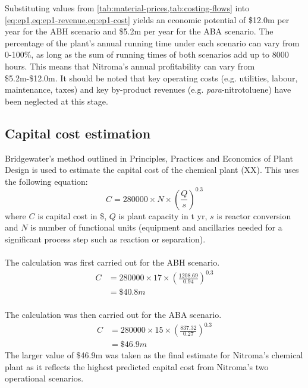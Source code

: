 Substituting values from \cref{tab:material-prices,tab:costing-flows} into \cref{eq:ep1,eq:ep1-revenue,eq:ep1-cost} yields an economic potential of \$12.0m per year for the ABH scenario and \$5.2m per year for the ABA scenario. The percentage of the plant's annual running time under each scenario can vary from 0-100\%, as long as the sum of running times of both scenarios add up to 8000 hours. This means that Nitroma's annual profitability can vary from \$5.2m-\$12.0m. It should be noted that key operating costs (e.g. utilities, labour, maintenance, taxes) and key by-product revenues (e.g. \textit{para}-nitrotoluene) have been neglected at this stage.

\subsection{Capital cost estimation}
Bridgewater's method outlined in Principles, Practices and Economics of Plant Design is used to estimate the capital cost of the chemical plant (XX). This uses the following equation:
\begin{equation}
    C= \num{280000} \times N \times \left(\frac{Q}{s}\right)^{0.3}
\end{equation}
where $C$ is capital cost in \$, $Q$ is  plant capacity in t yr, $s$ is reactor conversion and $N$ is number of functional units (equipment and ancillaries needed for a significant process step such as reaction or separation).
\\
\\
The calculation was first carried out for the ABH scenario.
\begin{align*}
C &= 280000 \times 17 \times \left(\frac{1208.69}{0.94}\right)^{0.3}  \\
  &=\$40.8m 
\end{align*}
\\
The calculation was then carried out for the ABA scenario.
\begin{align*}
C &= \num{280000} \times 15 \times \left(\frac{837.32}{0.27}\right)^{0.3}  \\
  &= \$46.9m 
\end{align*}
The larger value of \$46.9m was taken as the final estimate for Nitroma's chemical plant as it reflects the highest predicted capital cost from Nitroma's two operational scenarios.